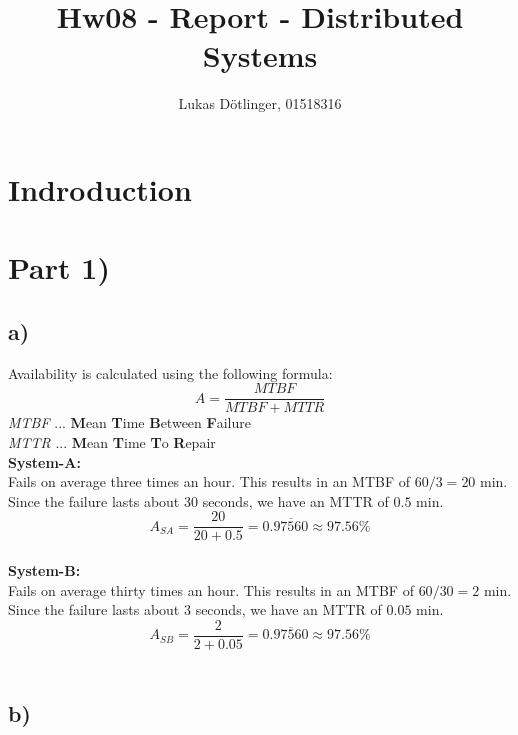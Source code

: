 \documentclass{article}
\begin{document}
  \title{Hw08 - Report - Distributed Systems}
  \date{}
  \author{Lukas Dötlinger, 01518316}
	
  \maketitle
  
  \section*{Indroduction}
  
  \section*{Part 1)}
    \subsection*{a)}
  
    Availability is calculated using the following formula:\\
    \begin{equation}
      A = \frac{MTBF}{MTBF + MTTR}
    \end{equation}
    \textit{MTBF} ... \textbf{M}ean \textbf{T}ime \textbf{B}etween \textbf{F}ailure\\
    \textit{MTTR} ... \textbf{M}ean \textbf{T}ime \textbf{T}o \textbf{R}epair\\
    \newline
    \textbf{System-A:}\\
    Fails on average three times an hour. This results in an MTBF of $60/3 = 20$ min. Since the failure lasts about 30 seconds, we have an MTTR of $0.5$ min.\\
    \[ A_{SA} = \frac{20}{20+0.5} = 0.\overline{97560} \approx 97.56 \% \]\\
    \newline
    \textbf{System-B:}\\
    Fails on average thirty times an hour. This results in an MTBF of $60/30 = 2$ min. Since the failure lasts about 3 seconds, we have an MTTR of $0.05$ min.\\
    \[ A_{SB} = \frac{2}{2+0.05} = 0.\overline{97560} \approx 97.56 \% \]\\
    
    \newpage
    \subsection*{b)}
    
\end{document}
